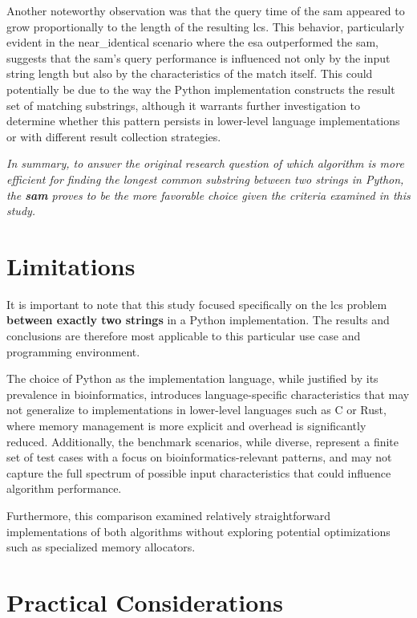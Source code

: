 Another noteworthy observation was that the query time of the \acrshort{sam} appeared to grow proportionally to the length of the resulting \acrshort{lcs}.
This behavior, particularly evident in the near\_identical scenario where the \acrshort{esa} outperformed the \acrshort{sam}, suggests that the \acrshort{sam}'s query performance is influenced not only by the input string length but also by the characteristics of the match itself.
This could potentially be due to the way the Python implementation constructs the result set of matching substrings, although it warrants further investigation to determine whether this pattern persists in lower-level language implementations or with different result collection strategies.

\textit{In summary, to answer the original research question of which algorithm is more efficient for finding the longest common substring between two strings in Python, the \textbf{\acrfull{sam}} proves to be the more favorable choice given the criteria examined in this study.}

\section{Limitations}

It is important to note that this study focused specifically on the \acrshort{lcs} problem \textbf{between exactly two strings} in a Python implementation.
The results and conclusions are therefore most applicable to this particular use case and programming environment.

The choice of Python as the implementation language, while justified by its prevalence in bioinformatics, introduces language-specific characteristics 
that may not generalize to implementations in lower-level languages such as C\cite{c} or Rust\cite{rust}, where memory management is more explicit and overhead is significantly reduced.
Additionally, the benchmark scenarios, while diverse, represent a finite set of test cases with a focus on bioinformatics-relevant patterns, 
and may not capture the full spectrum of possible input characteristics that could influence algorithm performance.

Furthermore, this comparison examined relatively straightforward implementations of both algorithms without exploring potential optimizations such as specialized memory allocators.

\section{Practical Considerations}

